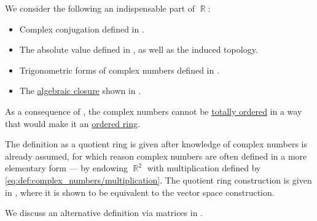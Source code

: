 \begin{comments}
  \item We consider the following an indispensable part of \( \BbbR \):
  \begin{itemize}
    \item Complex conjugation defined in .
    \item The absolute value defined in , as well as the induced topology.
    \item Trigonometric forms of complex numbers defined in .
    \item The \hyperref[def:algebraically_closed_field]{algebraic closure} shown in .
  \end{itemize}

  \item As a consequence of , the complex numbers cannot be \hyperref[def:totally_ordered_set]{totally ordered} in a way that would make it an \hyperref[def:ordered_semiring]{ordered ring}.

  \item The definition as a quotient ring is given after knowledge of complex numbers is already assumed, for which reason complex numbers are often defined in a more elementary form --- by endowing \( \BbbR^2 \) with multiplication defined by \eqref{eq:def:complex_numbers/multiplication}. The quotient ring construction is given in , where it is shown to be equivalent to the vector space construction.

  We discuss an alternative definition via matrices in .
\end{comments}

